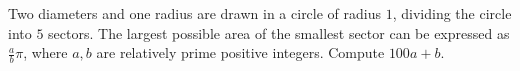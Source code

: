 Two diameters and one radius are drawn in a circle of radius $1$, dividing the circle into $5$ sectors. The largest possible area of the smallest sector can be expressed as $\frac{a}{b}\pi$, where $a, b$ are relatively prime positive integers. Compute $100a + b$.
